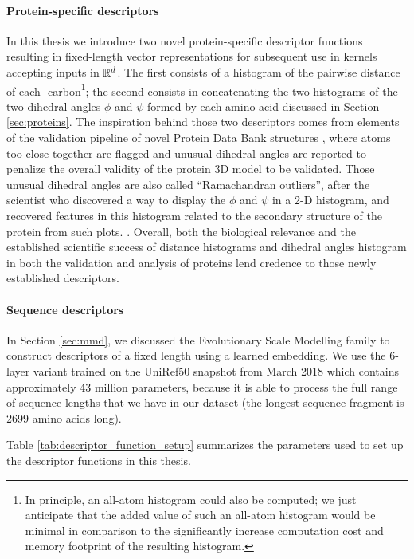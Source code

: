 \paragraph{Protein-specific descriptors} In this thesis we introduce two novel
protein-specific descriptor functions resulting in fixed-length vector
representations for subsequent use in kernels accepting inputs in $\mathbb{R}^d$. The
first consists of a histogram of the pairwise distance of each
\textalpha{}-carbon\footnote{In principle, an all-atom histogram could also be
computed; we just anticipate that the added value of such an all-atom histogram
would be minimal in comparison to the significantly increase computation cost
and memory footprint of the resulting histogram.}; the second consists in
concatenating the two histograms of the two dihedral angles $\phi$ and $\psi$
formed by each amino acid discussed in Section \ref{sec:proteins}. The
inspiration behind those two descriptors comes from elements of the validation
pipeline of novel Protein Data Bank structures \citep{read2011new,
gore2012implementing, gore2017validation}, where atoms too close together are
flagged and unusual dihedral angles are reported to penalize the overall
validity of the protein 3D model to be validated. Those unusual dihedral angles
are also called ``Ramachandran outliers'', after the scientist who discovered a
way to display the $\phi$ and $\psi$ in a 2-D histogram, and recovered features
in this histogram related to the secondary structure of the protein from such
plots. \citep{ramachandran1063Stereochemistry}. Overall, both the biological
relevance and the established scientific success of distance histograms and
dihedral angles histogram in both the validation and analysis of proteins lend
credence to those newly established descriptors.

\paragraph{Sequence descriptors} In Section \ref{sec:mmd}, we discussed the
Evolutionary Scale Modelling family to construct descriptors of a fixed length
using a learned embedding. We use the 6-layer variant trained on
the UniRef50 snapshot from March 2018 which contains approximately 43 million
parameters, because it is able to process the full range of sequence lengths
that we have in our dataset (the longest sequence fragment is 2699 amino acids long).

Table \ref{tab:descriptor_function_setup} summarizes the parameters used to set
up the descriptor functions in this thesis.

